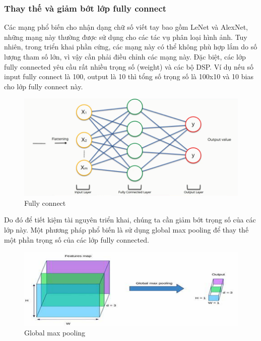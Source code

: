 \subsubsection{Thay thế và giảm bớt lớp fully connect}
Các mạng phổ biến cho nhận dạng chữ số viết tay bao gồm LeNet và AlexNet, những mạng này thường được sử dụng cho các tác vụ phân loại hình ảnh. Tuy nhiên, trong triển khai phần cứng, các mạng này có thể không phù hợp lắm do số lượng tham số lớn, vì vậy cần phải điều chỉnh các mạng này. Đặc biệt, các lớp fully connected yêu cầu rất nhiều trọng số (weight) và các bộ DSP. Ví dụ nếu số input fully connect là 100, output là 10 thì tổng số trọng số là 100x10 và 10 bias cho lớp fully connect này. 
\begin{figure}
    \centering
    \includegraphics[width=0.75\linewidth]{Images/fullyconn.png}
    \caption{Fully connect}
    \label{fig:enter-label}
\end{figure}
Do đó để tiết kiệm tài nguyên triển khai, chúng ta cần giảm bớt trọng số của các lớp này. Một phương pháp phổ biến là sử dụng global max pooling để thay thế một phần trọng số của các lớp fully connected.
\begin{figure}[H]
    \centering
    \includegraphics[width=0.75\linewidth]{Images/gmp.png}
    \caption{Global max pooling}
    \label{fig:enter-label}
\end{figure}
